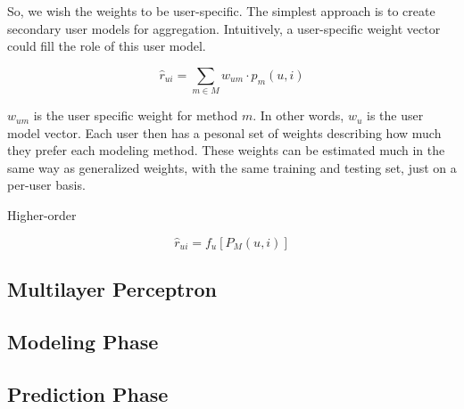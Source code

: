So, we wish the weights to be user-specific. The simplest approach is to create secondary user models for aggregation.
Intuitively, a user-specific weight vector could fill the role of this user model.

\begin{equation*}
  \hat{r}_{ui} = \sum_{m \in M} w_{um} \cdot p_m(u,i)
\end{equation*}

$w_{um}$ is the user specific weight for method $m$. In other words, $w_{u}$ is the user model vector.
Each user then has a pesonal set of weights describing how much they prefer each modeling method.
These weights can be estimated much in the same way as generalized weights, 
with the same training and testing set, just on a per-user basis.



Higher-order

\begin{equation*}
  \hat{r}_{ui} = f_{u}[ P_{M}(u,i) ]
\end{equation*}


\subsection{Multilayer Perceptron}
\subsection{Modeling Phase}
\subsection{Prediction Phase}




